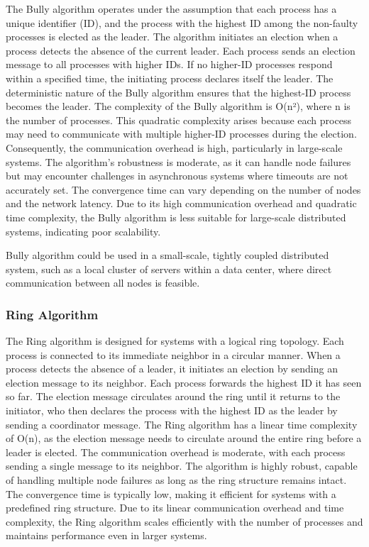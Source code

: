 The Bully algorithm operates under the assumption that each process has a unique identifier (ID), and the process with the highest ID among the non-faulty processes is elected as the leader. The algorithm initiates an election when a process detects the absence of the current leader. Each process sends an election message to all processes with higher IDs. If no higher-ID processes respond within a specified time, the initiating process declares itself the leader. The deterministic nature of the Bully algorithm ensures that the highest-ID process becomes the leader.
The complexity of the Bully algorithm is O(n²), where n is the number of processes. This quadratic complexity arises because each process may need to communicate with multiple higher-ID processes during the election. Consequently, the communication overhead is high, particularly in large-scale systems. The algorithm’s robustness is moderate, as it can handle node failures but may encounter challenges in asynchronous systems where timeouts are not accurately set. The convergence time can vary depending on the number of nodes and the network latency. Due to its high communication overhead and quadratic time complexity, the Bully algorithm is less suitable for large-scale distributed systems, indicating poor scalability.

Bully algorithm could be used in a small-scale, tightly coupled distributed system, such as a local cluster of servers within a data center, where direct communication between all nodes is feasible.

\subsubsection{Ring Algorithm}

The Ring algorithm is designed for systems with a logical ring topology. Each process is connected to its immediate neighbor in a circular manner. When a process detects the absence of a leader, it initiates an election by sending an election message to its neighbor. Each process forwards the highest ID it has seen so far. The election message circulates around the ring until it returns to the initiator, who then declares the process with the highest ID as the leader by sending a coordinator message.
The Ring algorithm has a linear time complexity of O(n), as the election message needs to circulate around the entire ring before a leader is elected. The communication overhead is moderate, with each process sending a single message to its neighbor. The algorithm is highly robust, capable of handling multiple node failures as long as the ring structure remains intact. The convergence time is typically low, making it efficient for systems with a predefined ring structure. Due to its linear communication overhead and time complexity, the Ring algorithm scales efficiently with the number of processes and maintains performance even in larger systems.

